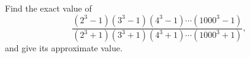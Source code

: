 Find the exact value of
\[
\dfrac{(2^3-1)(3^3-1)(4^3-1)\cdots(1000^3-1)}{(2^3+1)(3^3+1)(4^3+1)\cdots(1000^3+1)},
\]
and give its approximate value.
